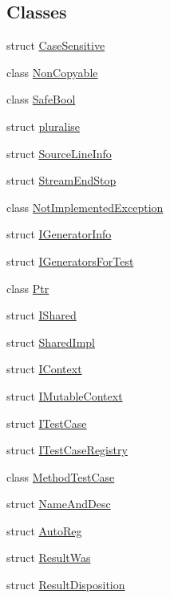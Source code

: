 \subsection*{Classes}
\begin{DoxyCompactItemize}
\item 
struct \hyperlink{struct_catch_1_1_case_sensitive}{Case\-Sensitive}
\item 
class \hyperlink{class_catch_1_1_non_copyable}{Non\-Copyable}
\item 
class \hyperlink{class_catch_1_1_safe_bool}{Safe\-Bool}
\item 
struct \hyperlink{struct_catch_1_1pluralise}{pluralise}
\item 
struct \hyperlink{struct_catch_1_1_source_line_info}{Source\-Line\-Info}
\item 
struct \hyperlink{struct_catch_1_1_stream_end_stop}{Stream\-End\-Stop}
\item 
class \hyperlink{class_catch_1_1_not_implemented_exception}{Not\-Implemented\-Exception}
\item 
struct \hyperlink{struct_catch_1_1_i_generator_info}{I\-Generator\-Info}
\item 
struct \hyperlink{struct_catch_1_1_i_generators_for_test}{I\-Generators\-For\-Test}
\item 
class \hyperlink{class_catch_1_1_ptr}{Ptr}
\item 
struct \hyperlink{struct_catch_1_1_i_shared}{I\-Shared}
\item 
struct \hyperlink{struct_catch_1_1_shared_impl}{Shared\-Impl}
\item 
struct \hyperlink{struct_catch_1_1_i_context}{I\-Context}
\item 
struct \hyperlink{struct_catch_1_1_i_mutable_context}{I\-Mutable\-Context}
\item 
struct \hyperlink{struct_catch_1_1_i_test_case}{I\-Test\-Case}
\item 
struct \hyperlink{struct_catch_1_1_i_test_case_registry}{I\-Test\-Case\-Registry}
\item 
class \hyperlink{class_catch_1_1_method_test_case}{Method\-Test\-Case}
\item 
struct \hyperlink{struct_catch_1_1_name_and_desc}{Name\-And\-Desc}
\item 
struct \hyperlink{struct_catch_1_1_auto_reg}{Auto\-Reg}
\item 
struct \hyperlink{struct_catch_1_1_result_was}{Result\-Was}
\item 
struct \hyperlink{struct_catch_1_1_result_disposition}{Result\-Disposition}

\end{DoxyCompactItemize}
